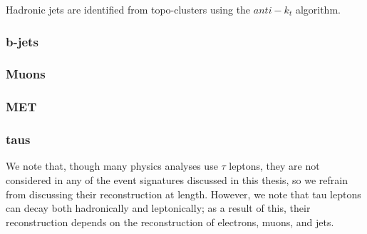 Hadronic jets are identified from topo-clusters using the $anti-k_{t}$ algorithm.

\subsubsection{b-jets} \label{sec:b-jets} 

\subsubsection{Muons} \label{sec:Muons} 

\subsubsection{MET} \label{sec:MET}

\subsubsection{taus} \label{sec:taus}
We note that, though many physics analyses use $\tau$ leptons, they are not considered in any of the event signatures discussed in this thesis, so we refrain from discussing their reconstruction at length. However, we note that tau leptons can decay both hadronically and leptonically; as a result of this, their reconstruction depends on the reconstruction of electrons, muons, and jets.